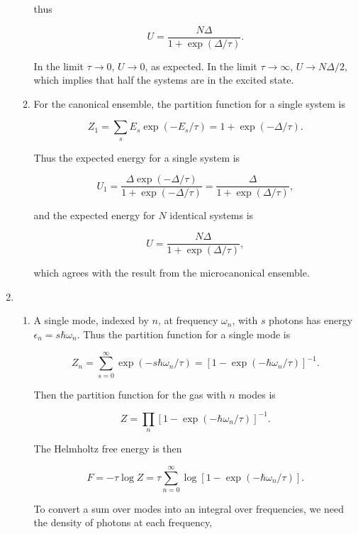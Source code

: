 \documentclass{article}
\begin{document}
\begin{enumerate}
\begin{enumerate}
		thus 

		$$U = \frac{N \Delta}{1 + \exp(\Delta/\tau)}.$$

		In the limit $\tau \to 0$, $U \to 0$, as expected. In the limit $\tau \to \infty$, $U \to N\Delta / 2$, which implies that half the systems are in the excited state.

		\item

		For the canonical ensemble, the partition function for a single system is

		$$Z_1 = \sum \limits_s E_s \exp(- E_s/\tau) = 1 + \exp(- \Delta / \tau).$$

		Thus the expected energy for a single system is 

		$$U_1 = \frac{\Delta \exp(-\Delta / \tau)}{1 + \exp(- \Delta / \tau)} = \frac{\Delta}{1 + \exp(\Delta / \tau)},$$

		and the expected energy for $N$ identical systems is

		$$U = \frac{N \Delta}{1 + \exp(\Delta / \tau)},$$

		which agrees with the result from the microcanonical ensemble.


	\end{enumerate}

	\item

	\begin{enumerate}

		\item

		A single mode, indexed by $n$, at frequency $\omega_n$, with $s$ photons has energy $\epsilon_n = s \hbar \omega_n$. Thus the partition function for a single mode is

		$$Z_n = \sum \limits_{s=0}^{\infty} \exp \left( -s \hbar \omega_n / \tau \right) = \left[ 1 - \exp \left( - \hbar \omega_n / \tau \right) \right]^{-1}.$$

		Then the partition function for the gas with $n$ modes is 

		$$Z = \prod\limits_{n} \left[ 1 - \exp \left( -\hbar \omega_n / \tau \right) \right]^{-1}.$$

		The Helmholtz free energy is then

		$$F = -\tau \log Z = \tau \sum \limits_{n=0}^\infty  \log \left[ 1 - \exp \left( -\hbar \omega_n / \tau \right) \right].$$

		To convert a sum over modes into an integral over frequencies, we need the density of photons at each frequency,


\end{enumerate}
\end{enumerate}
\end{document}
